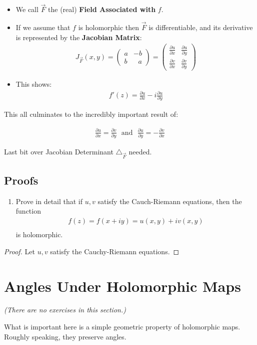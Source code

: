 \begin{itemize}
		\item We call $\vec{F}$ the (real) \textbf{Field Associated with} $f.$ 
		\item If we assume that $f$ is holomorphic then $\vec{F}$ is differentiable, and its derivative is represented by the \textbf{Jacobian Matrix}:
		\begin{align*}
			J_{\vec{F}}(x, y) = \left( \begin{matrix}
				a & -b \\
				b &\,\,\,\,  a 
			\end{matrix}
			\right)
			= \left( \begin{matrix}
				\frac{\partial u}{\partial x} & \frac{\partial u}{\partial y} \\
				\frac{\partial v}{\partial x} & \frac{\partial v}{\partial y}
			\end{matrix} \right)
		\end{align*}
		\item This shows:
		\begin{align*}
			f'(z) = \frac{\partial u}{\partial x} - i\frac{\partial u}{\partial y}
		\end{align*}
\end{itemize}
This all culminates to the incredibly important result of:
\begin{defn}
	\begin{align*}
		\frac{\partial u}{\partial x} = \frac{\partial v}{\partial y} \,\,\,\, \text{and} \,\,\,\, \frac{\partial u}{\partial y} = -\frac{\partial v}{\partial x}
	\end{align*}	
\end{defn}


Last bit over Jacobian Determinant $\triangle_{\vec{F}}$ needed.

\subsection{Proofs}
\begin{enumerate}
	\item Prove in detail that if $u, v$ satisfy the Cauch-Riemann equations, then the function
	\begin{align*}
		f(z) = f(x + iy) = u(x, y) + iv(x, y) \\
	\end{align*}
	is holomorphic.
\end{enumerate}
\begin{proof}
	Let $u,v$ satisfy the Cauchy-Riemann equations.
\end{proof}

\section{Angles Under Holomorphic Maps}
\textit{(There are no exercises in this section.)}

What is important here is a simple geometric property of holomorphic maps. Roughly speaking, they preserve angles.

